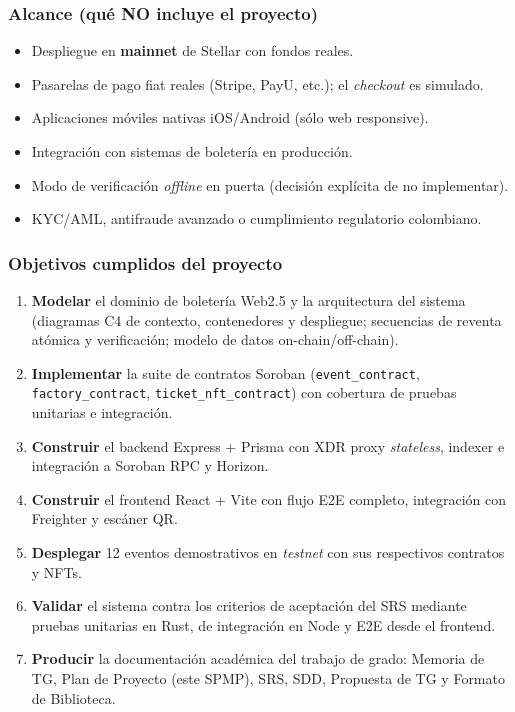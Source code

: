 \documentclass[12pt,oneside]{report}
\begin{document}
      \subsubsection*{Alcance (qué NO incluye el proyecto)}
      \begin{itemize}
        \item Despliegue en \textbf{mainnet} de Stellar con fondos reales.
        \item Pasarelas de pago fiat reales (Stripe, PayU, etc.); el \textit{checkout} es simulado.
        \item Aplicaciones móviles nativas iOS/Android (sólo web responsive).
        \item Integración con sistemas de boletería en producción.
        \item Modo de verificación \textit{offline} en puerta (decisión explícita de no implementar).
        \item KYC/AML, antifraude avanzado o cumplimiento regulatorio colombiano.
      \end{itemize}

      \subsubsection*{Objetivos cumplidos del proyecto}
      \begin{enumerate}
        \item \textbf{Modelar} el dominio de boletería Web2.5 y la arquitectura del sistema (diagramas C4 de contexto, contenedores y despliegue; secuencias de reventa atómica y verificación; modelo de datos on-chain/off-chain).
        \item \textbf{Implementar} la suite de contratos Soroban (\texttt{event\_contract}, \texttt{factory\_contract}, \texttt{ticket\_nft\_contract}) con cobertura de pruebas unitarias e integración.
        \item \textbf{Construir} el backend Express + Prisma con XDR proxy \textit{stateless}, indexer e integración a Soroban RPC y Horizon.
        \item \textbf{Construir} el frontend React + Vite con flujo E2E completo, integración con Freighter y escáner QR.
        \item \textbf{Desplegar} 12 eventos demostrativos en \textit{testnet} con sus respectivos contratos y NFTs.
        \item \textbf{Validar} el sistema contra los criterios de aceptación del SRS mediante pruebas unitarias en Rust, de integración en Node y E2E desde el frontend.
        \item \textbf{Producir} la documentación académica del trabajo de grado: Memoria de TG, Plan de Proyecto (este SPMP), SRS, SDD, Propuesta de TG y Formato de Biblioteca.
      \end{enumerate}
\end{document}
